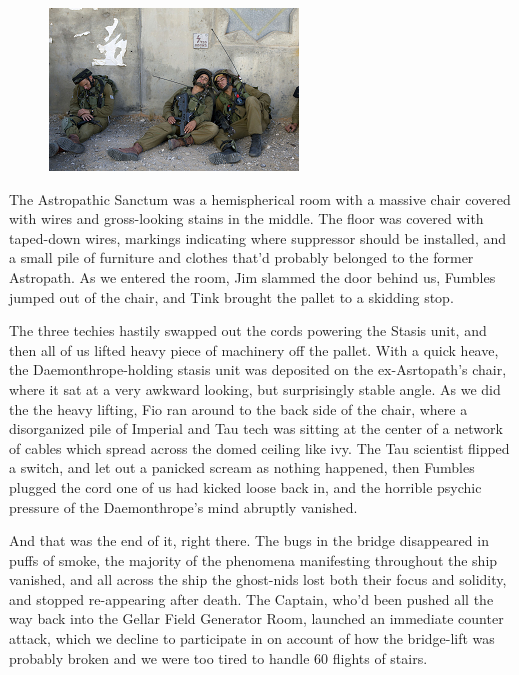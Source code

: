 \begin{figure}
	\begin{center}
		\includegraphics[width=\figwidth]{pics/15/71.png}
	\end{center}
\end{figure}
The Astropathic Sanctum was a hemispherical room with a massive chair covered with wires and gross-looking stains in the middle. 
The floor was covered with taped-down wires, markings indicating where suppressor should be installed, and a small pile of furniture and clothes that'd probably belonged to the former Astropath. 
As we entered the room, Jim slammed the door behind us, Fumbles jumped out of the chair, and Tink brought the pallet to a skidding stop.

The three techies hastily swapped out the cords powering the Stasis unit, and then all of us lifted heavy piece of machinery off the pallet. 
With a quick heave, the Daemonthrope-holding stasis unit was deposited on the ex-Asrtopath's chair, where it sat at a very awkward looking, but surprisingly stable angle. 
As we did the the heavy lifting, Fio ran around to the back side of the chair, where a disorganized pile of Imperial and Tau tech was sitting at the center of a network of cables which spread across the domed ceiling like ivy. 
The Tau scientist flipped a switch, and let out a panicked scream as nothing happened, then Fumbles plugged the cord one of us had kicked loose back in, and the horrible psychic pressure of the Daemonthrope's mind abruptly vanished.

And that was the end of it, right there. 
The bugs in the bridge disappeared in puffs of smoke, the majority of the phenomena manifesting throughout the ship vanished, and all across the ship the ghost-nids lost both their focus and solidity, and stopped re-appearing after death. 
The Captain, who'd been pushed all the way back into the Gellar Field Generator Room, launched an immediate counter attack, which we decline to participate in on account of how the bridge-lift was probably broken and we were too tired to handle 60 flights of stairs.

